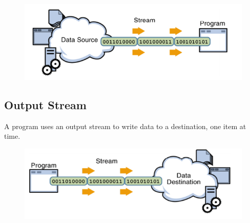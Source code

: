\documentclass[11pt,a4paper]{article}
\begin{document}
\begin{center}
\begin{figure}[H]
\includegraphics[scale = 0.7]{InputStream.png}
\end{figure}
\end{center}

\subsection*{Output Stream}
A program uses an output stream to write data to a destination, one item at time.

\begin{center}
\begin{figure}[H]
\includegraphics[scale = 0.7]{OutputStream.png}
\end{figure}
\end{center}
\end{document}
